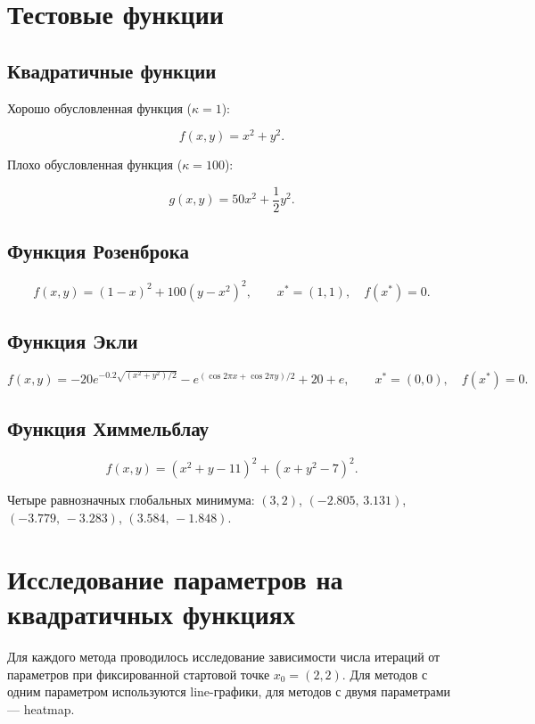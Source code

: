 \documentclass[a4paper,12pt]{article}
\begin{document}
\section{Тестовые функции}

\subsection{Квадратичные функции}

Хорошо обусловленная функция ($\kappa=1$):

\[
f(x,y)=x^2+y^2.
\]

Плохо обусловленная функция ($\kappa=100$):

\[
g(x,y)=50x^2+\frac12 y^2.
\]

\subsection{Функция Розенброка}

\[
f(x,y)
=
(1-x)^2+100(y-x^2)^2,
\qquad x^*=(1,1),\quad f(x^*)=0.
\]

\subsection{Функция Экли}

\[
f(x,y)
=
-20e^{-0.2\sqrt{(x^2+y^2)/2}}
-
e^{(\cos 2\pi x+\cos 2\pi y)/2}
+20+e,
\qquad x^*=(0,0),\quad f(x^*)=0.
\]

\subsection{Функция Химмельблау}

\[
f(x,y)
=
(x^2+y-11)^2+(x+y^2-7)^2.
\]

Четыре равнозначных глобальных минимума:
$(3,2)$, $(-2.805,\,3.131)$, $(-3.779,\,-3.283)$, $(3.584,\,-1.848)$.

\section{Исследование параметров на квадратичных функциях}

Для каждого метода проводилось исследование зависимости
числа итераций от параметров при фиксированной стартовой точке $x_0=(2,2)$.
Для методов с одним параметром используются line-графики,
для методов с двумя параметрами — heatmap.
\end{document}

